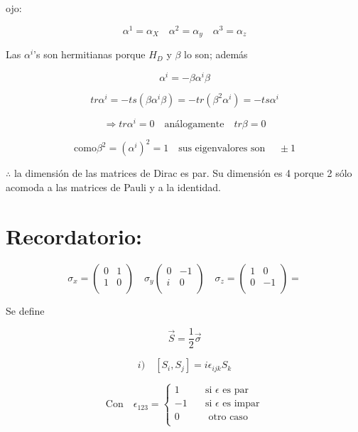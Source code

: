 \documentclass{report}
\begin{document}
ojo:

\[\alpha^{1} = \alpha_{X} \quad \alpha^2 = \alpha_{y} \quad \alpha^3 = \alpha _{z} \]

Las $\alpha^i$'s son hermitianas porque $H_{D}$ y $\beta$ lo son; además

\[\alpha^i = - \beta \alpha^i \beta\]

\[tr \alpha ^ i = - ts (\beta \alpha^i \beta) = - tr(\beta ^2 \alpha^i) = -ts \alpha ^i\]

\[\Rightarrow tr \alpha^i = 0 \quad \text{análogamente} \quad  tr \beta =0\]

\[\text{como} \beta^2 = (\alpha ^i)^2 = 1 \quad \text{sus eigenvalores son } \quad \pm 1\]

$\therefore$ la dimensión de las matrices de Dirac es par. Su dimensión es 4 porque 2 sólo acomoda a las matrices de Pauli y a la identidad.

\section{Recordatorio:}

\[\sigma_{x} = \left ( \begin{array}{cc}
 0 & 1  \\
 1 & 0 \\ \end{array} \right)  
 \quad \sigma_{y}\left ( \begin{array}{cc}
 0 & -1  \\
 i & 0 \\ \end{array} \right) 
 \quad \sigma_{z}= \left ( \begin{array}{cc}
 1 & 0  \\
 0 & -1 \\ \end{array} \right) =\]

Se define

\begin{equation}
\overrightarrow{S} = \frac{1}{2} \overrightarrow{\sigma}
\end{equation}

\[i) \quad[S_{i},S_{j}] = i \epsilon_{ijk}S_{k} \]

\[\text{Con} \quad \epsilon_{123} =
  \begin{cases}
    1       & \quad \text{si } \epsilon \text{ es par}\\
    -1  & \quad \text{si } \epsilon \text{ es impar}\\
    0  & \quad \text{ otro caso}\\
  \end{cases}\]
\end{document}
